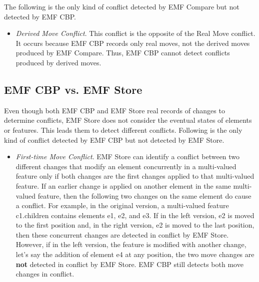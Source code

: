 The following is the only kind of conflict detected by EMF Compare but not detected by EMF CBP.
\begin{itemize}
  \item \emph{Derived Move Conflict}. This conflict is the opposite of the Real Move conflict. It occurs because EMF CBP records only real moves, not the derived moves produced by EMF Compare. Thus, EMF CBP cannot detect conflicts produced by derived moves.
\end{itemize}

\subsection{EMF CBP vs. EMF Store}
\label{sec:emf_cbp_vs_emf_store}
Even though both EMF CBP and EMF Store real records of changes to determine conflicts, EMF Store does not consider the eventual states of elements or features. This leads them to detect different conflicts. Following is the only kind of conflict detected by EMF CBP but not detected by EMF Store.
\begin{itemize}
  \item \emph{First-time Move Conflict}. EMF Store can identify a conflict between two different changes that modify an element concurrently in a multi-valued feature only if both changes are the first changes applied to that multi-valued feature. If an earlier change is applied on another element in the same multi-valued feature, then the following two changes on the same element do cause a conflict. For example, in the original version, a multi-valued feature \textsf{c1}.\textsf{children} contains elements \textsf{e1}, \textsf{e2}, and \textsf{e3}. If in the left version, \textsf{e2} is moved to the first position and, in the right version, \textsf{e2} is moved to the last position, then these concurrent changes are detected in conflict by EMF Store. However, if in the left version, the feature is modified with another change, let’s say the addition of element \textsf{e4} at any position, the two \textsf{move} changes are \textbf{not} detected in conflict by EMF Store. EMF CBP still detects both \textsf{move} changes in conflict.
\end{itemize}


